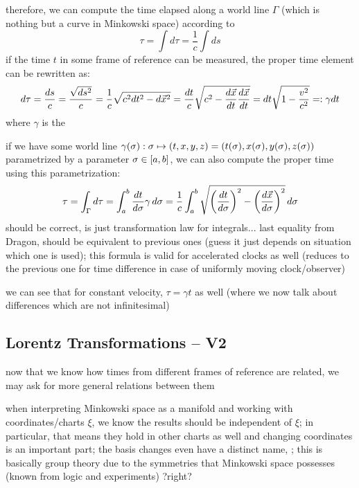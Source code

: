 therefore, we can compute the time elapsed along a world line $\Gamma$ (which is nothing but a curve in Minkowski space) according to
\begin{equation}
\tau = \int d\tau = \frac{1}{c} \int ds
\end{equation}
if the time $t$ in some frame of reference can be measured, the proper time element can be rewritten as:
\begin{equation}
d\tau = \frac{ds}{c} = \frac{\sqrt{ds^2}}{c} = \frac{1}{c} \sqrt{c^2 dt^2 - d\vec{x}^2} = \frac{dt}{c} \sqrt{c^2 - \dv{\vec{x}}{t} \dv{\vec{x}}{t}} = dt \sqrt{1 - \frac{v^2}{c^2}} =: \gamma dt
\end{equation}
where $\gamma$ is the 


if we have some world line $\gamma(\sigma): \sigma \mapsto \qty(t, x, y, z) = \qty(t(\sigma), x(\sigma), y(\sigma), z(\sigma))$ parametrized by a parameter $\sigma \in \qty[a, b]$, we can also compute the proper time using this parametrization:
\begin{equation}
\tau = \int_\Gamma d\tau = \int_a^b \dv{t}{\sigma} \gamma \, d\sigma = \frac{1}{c} \int_a^b \sqrt{\qty(\dv{t}{\sigma})^2 - \qty(\dv{\vec{x}}{\sigma})^2} \, d\sigma
\end{equation}
should be correct, is just transformation law for integrals... last equality from Dragon, should be equivalent to previous ones (guess it just depends on situation which one is used); this formula is valid for accelerated clocks as well (reduces to the previous one for time difference in case of uniformly moving clock/observer)


we can see that for constant velocity, $\tau = \gamma t$ as well (where we now talk about differences which are not infinitesimal)



		\subsection{Lorentz Transformations -- V2}
now that we know how times from different frames of reference are related, we may ask for more general relations between them


when interpreting Minkowski space as a manifold and working with coordinates/charts $\xi$, we know the results should be independent of $\xi$; in particular, that means they hold in other charts as well and changing coordinates is an important part; the basis changes even have a distinct name, ; this is basically group theory due to the symmetries that Minkowski space possesses (known from logic and experiments) ?right?



